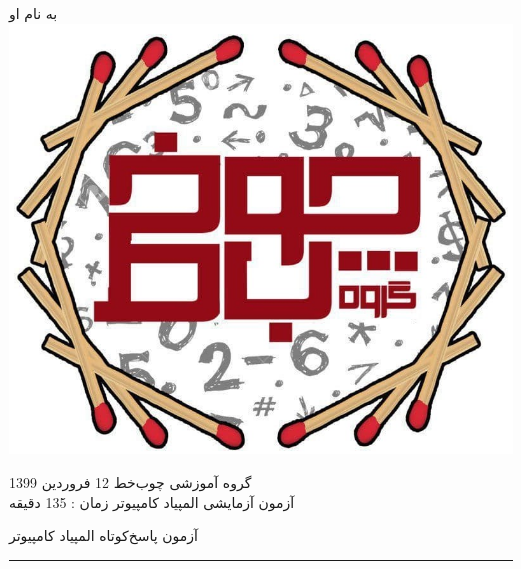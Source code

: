 \documentclass{article}
\begin{document}
\onehalfspacing
\large
	\begin{center}
		\small به نام او\\ 
		\vspace*{6pt}
		\includegraphics[scale=0.2]{Choobkhat_Logo.jpg}
	\end{center}
	\begin{small}
		گروه آموزشی چوب‌خط
		\vspace*{-.01cm}\hfill 12 فروردین 1399 \\
		آزمون آزمایشی المپیاد کامپیوتر 
		\vspace*{-.01cm}\hfill زمان : 135 دقیقه \
	\end{small}
	\begin{center}
		\begin{large}
		آزمون پاسخ‌کوتاه المپیاد کامپیوتر
		\end{large}
	\end{center}
	\begin{center}
		\hrule width 1\textwidth
	\end{center}
\end{document}
